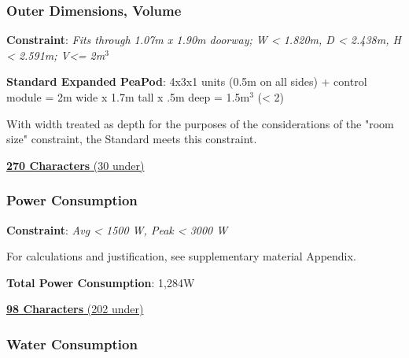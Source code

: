 \documentclass{report}
\begin{document}
\newpage

\subsubsection{Outer Dimensions, Volume}
\label{sec:constraints-volume}

\textbf{Constraint}: \textit{Fits through 1.07m x 1.90m doorway; W < 1.820m, D < 2.438m, H < 2.591m; V<= 2m${}^3$}



\textbf{Standard Expanded PeaPod}: 4x3x1 units (0.5m on all sides) + control module = 2m wide x 1.7m tall x .5m deep = 1.5m${}^3$ (< 2)

With width treated as depth for the purposes of the considerations of the "room size" constraint, the Standard meets this constraint.

\uline{\textbf{270 Characters} (30 under)}

\subsubsection{Power Consumption}
\label{sec:constraints-power}

\textbf{Constraint}: \textit{Avg < 1500 W, Peak < 3000 W}

For calculations and justification, see supplementary material Appendix.

\textbf{Total Power Consumption}: 1,284W

\uline{\textbf{98 Characters} (202 under)}

\subsubsection{Water Consumption}
\label{sec:constraints-water}
\end{document}
